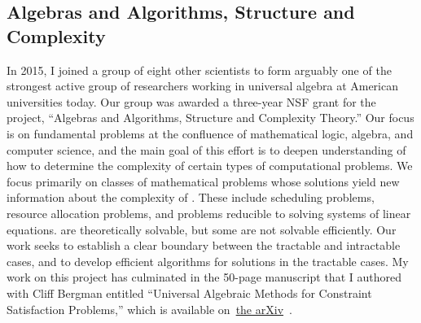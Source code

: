 \subsection{Algebras and Algorithms, Structure and Complexity}
\label{sec:csp}
In 2015, I joined a group of eight other scientists to form arguably one of the strongest active group of researchers working in universal algebra at American universities today. Our group was awarded a three-year NSF grant for the project, ``Algebras and Algorithms, Structure and Complexity Theory.'' Our focus is on fundamental problems at the confluence of mathematical logic, algebra, and computer science, and the main goal of this effort is to deepen understanding of how to determine the complexity of certain types of computational problems.  We focus primarily on classes of mathematical problems whose solutions yield new information about the complexity of \csps. These include scheduling problems, resource allocation problems, and problems reducible to solving
systems of linear equations. \csps are theoretically solvable, but some are not solvable efficiently.  Our work seeks to establish a clear boundary between the tractable and intractable cases, and to develop efficient algorithms for solutions in the tractable cases.
My work on this project has culminated in the 50-page manuscript that I authored with Cliff Bergman entitled ``Universal Algebraic Methods for Constraint Satisfaction Problems,'' which is available on~\href{https://arxiv.org/abs/1611.02867}{the arXiv}~\cite{Bergman-DeMeo:2016}.





% 



 \newpage

     
     



















